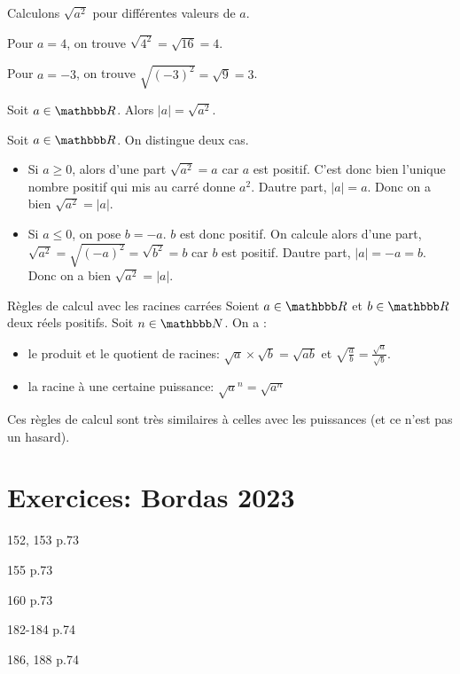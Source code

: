 \documentclass[10pt,a4paper,openany,twoside,prof]{book}
\begin{document}
\begin{ex}{}{}
  Calculons $\sqrt{a^2}$ pour différentes valeurs de $a$.

  Pour $a=4$, on trouve $\sqrt{4^2} = \sqrt{16} = 4$.

  Pour $a=-3$, on trouve $\sqrt{(-3)^2}=\sqrt{9}=3$.
\end{ex}

\begin{prop}{}{}
    Soit $a\in\R$. Alors $|a|=\sqrt{a^2}$.
\end{prop}

\begin{dem}{}{}
    Soit $a\in\R$. On distingue deux cas.
  \begin{itemize}
    \item Si $a\ge0$, alors d'une part $\sqrt{a^2} = a$ car $a$ est positif. C'est donc bien l'unique nombre positif qui mis au carré donne $a^2$. Dautre part, $|a| =  a$. Donc on a bien $\sqrt{a^2}=|a|$.
    \item Si $a\le0$, on pose $b=-a$. $b$ est donc positif. On calcule alors d'une part, $\sqrt{a^2} = \sqrt{(-a)^2}=\sqrt{b^2} = b$ car $b$ est positif. Dautre part, $|a| =  -a = b$. Donc on a bien $\sqrt{a^2}=|a|$.
  \end{itemize}

\end{dem}

\begin{prop}{Règles de calcul avec les racines carrées}{}
	Soient $a\in\R$ et $b\in\R$ deux réels positifs. Soit $n\in\N$. On a :

	\begin{itemize}
		\item le produit et le quotient de racines: $\sqrt{a}\times\sqrt{b} = \sqrt{ab}$ et $\sqrt{\frac{a}{b}}=\frac{\sqrt{a}}{\sqrt{b}}$.
		\item la racine à une certaine puissance: $\sqrt{a}^n=\sqrt{a^n}$
	\end{itemize}
\end{prop}

\begin{rem}{}{}
  Ces règles de calcul sont très similaires à celles avec les puissances (et ce n'est pas un hasard).
\end{rem}

\newpage
\section*{Exercices: Bordas 2023}
\begin{bookexos}{152, 153 p.73}\end{bookexos}
\begin{bookexo}{155 p.73}\end{bookexo}
\begin{bookexo}{160 p.73}\end{bookexo}
\begin{bookexos}{182-184 p.74}\end{bookexos}
\begin{bookexos}{186, 188 p.74}\end{bookexos}
\end{document}
